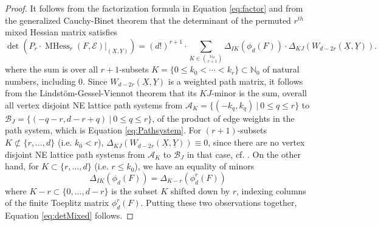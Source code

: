 \documentclass[unnumsec,webpdf,modern,medium]{oup-authoring-template}
\newcommand{\N}{\mathbb{N}}
\theoremstyle{theorem}
\theoremstyle{definition}
\begin{document}
\begin{proof}
	It follows from the factorization formula in Equation \eqref{eq:factor} and from the generalized Cauchy-Binet theorem that the determinant of the permuted $r^{th}$ mixed Hessian matrix satisfies
	\begin{equation}
		\label{eq:pluck1}
		\det\left(P_r\cdot \operatorname{MHess}_r(F,\mathcal{E})|_{(\underline{X},\underline{Y})}\right)=(d!)^{r+1}\cdot \sum_{K\in\binom{\N_0}{r+1}}\Delta_{IK}\left(\phi_d(F)\right)\cdot \Delta_{KJ}\left(W_{d-2r}\left(\underline{X},\underline{Y}\right)\right).
	\end{equation}
	where the sum is over all $r+1$-subsets $K=\{0\leq k_0<\cdots<k_r\}\subset\N_0$ of natural numbers, including $0$.  Since $W_{d-2r}(\underline{X},\underline{Y})$ is a weighted path matrix, it follows from the Lindst\"om-Gessel-Viennot theorem \cite[Fact 4.17]{MMS} that its $KJ$-minor is the sum, overall all vertex disjoint NE lattice path systems from $\mathcal{A}_K=\{(-k_q,k_q) \ | \ 0\leq q\leq r\}$ to $\mathcal{B}_J=\{(-q-r,d-r+q) \ | \ 0\leq q\leq r\}$, of the product of edge weights in the path system, which is Equation \eqref{eq:Pathsystem}.  For $(r+1)$-subsets $K\not\subset\{r,\ldots,d\}$ (i.e. $k_0<r$), $\Delta_{KJ}(W_{d-2r}(\underline{X},\underline{Y}))\equiv 0$, since there are no vertex disjoint NE lattice path systems from $\mathcal{A}_K$ to $\mathcal{B}_J$ in that case, cf. \cite[Lemma 4.18]{MMS}.  On the other hand, for $K\subset\{r,\ldots,d\}$ (i.e. $r\leq k_0$), we have an equality of minors 
	$$\Delta_{IK}(\phi_d(F))=\Delta_{K-r}(\phi^r_d(F))$$
	where $K-r\subset \{0,\ldots,d-r\}$ is the subset $K$ shifted down by $r$, indexing columns of the finite Toeplitz matrix $\phi^r_d(F)$.  Putting these two observations together, Equation \eqref{eq:detMixed} follows.
\end{proof}




\end{document}
